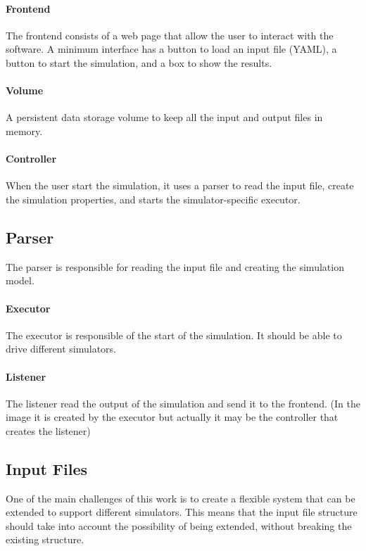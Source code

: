 \documentclass[12pt,a4paper,openright,twoside]{book}
\begin{document}
\paragraph*{Frontend} The frontend consists of a web page that allow the user to interact with the software. 
A minimum interface has a button to load an input file (YAML), a button to start the simulation, and a box to show the results.

\paragraph*{Volume} A persistent data storage volume to keep all the input and output files in memory.

\paragraph*{Controller} When the user start the simulation, it uses a parser to read the input file, create the simulation properties,
and starts the simulator-specific executor.

\subsection{Parser} 
The parser is responsible for reading the input file and creating the simulation model.

\paragraph*{Executor} The executor is responsible of the start of the simulation. It should be able to drive different simulators.

\paragraph*{Listener} The listener read the output of the simulation and send it to the frontend.
(In the image it is created by the executor but actually it may be the controller that creates the listener)

\subsection{Input Files}

One of the main challenges of this work is to create a flexible system that can be extended to support different simulators.
This means that the input file structure should take into account the possibility of being extended, without breaking the existing structure.
\end{document}
